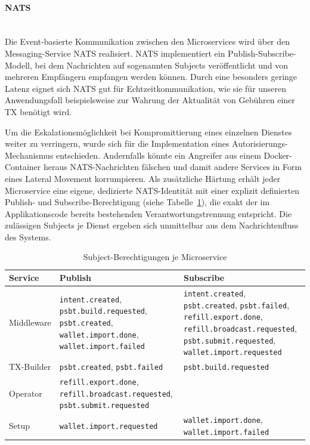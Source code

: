 \paragraph{\ac{NATS}} \mbox{}\\
Die Event-basierte Kommunikation zwischen den Microservices wird über den Messaging-Service \ac{NATS} realisiert. \ac{NATS} implementiert ein Publish-Subscribe-Modell, bei dem Nachrichten auf sogenannten Subjects veröffentlicht und von mehreren Empfängern empfangen werden können. Durch eine besonders geringe Latenz eignet sich \ac{NATS} gut für Echtzeitkommunikation, wie sie für unseren Anwendungsfall beispielsweise zur Wahrung der Aktualität von Gebühren einer \ac{TX} benötigt wird.

Um die Eskalationsmöglichkeit bei Kompromittierung eines einzelnen Dienstes weiter zu verringern, wurde sich für die Implementation eines Autorisierungs-Mechanismus entschieden.
Andernfalls könnte ein Angreifer aus einem Docker-Container heraus \ac{NATS}-Nachrichten fälschen und damit andere Services in Form eines Lateral Movement korrumpieren.
Als zusätzliche Härtung erhält jeder Microservice eine eigene, dedizierte \ac{NATS}-Identität mit einer explizit definierten Publish- und Subscribe-Berechtigung (siehe Tabelle~\ref{tab:nats_permissions}), die exakt der im Applikationscode bereits bestehenden Verantwortungstrennung entspricht. Die zulässigen Subjects je Dienst ergeben sich unmittelbar aus dem Nachrichtenfluss des Systems.
\begin{table}[htbp]
\centering
\begin{tabular}{|l|p{6.0cm}|p{6.0cm}|}
\hline
\textbf{Service} & \textbf{Publish} & \textbf{Subscribe} \\
\hline
Middleware & \texttt{intent.created}, \texttt{psbt.build.requested}, \texttt{psbt.created}, \texttt{wallet.import.done}, \texttt{wallet.import.failed} & \texttt{intent.created}, \texttt{psbt.created}, \texttt{psbt.failed}, \texttt{refill.export.done}, \texttt{refill.broadcast.requested}, \texttt{psbt.submit.requested}, \texttt{wallet.import.requested} \\
\hline
TX-Builder & \texttt{psbt.created}, \texttt{psbt.failed} & \texttt{psbt.build.requested} \\
\hline
Operator & \texttt{refill.export.done}, \texttt{refill.broadcast.requested}, \texttt{psbt.submit.requested} &  \\
\hline
Setup & \texttt{wallet.import.requested} & \texttt{wallet.import.done}, \texttt{wallet.import.failed} \\
\hline
\end{tabular}
\caption{Subject-Berechtigungen je Microservice}
\label{tab:nats_permissions}
\end{table}

